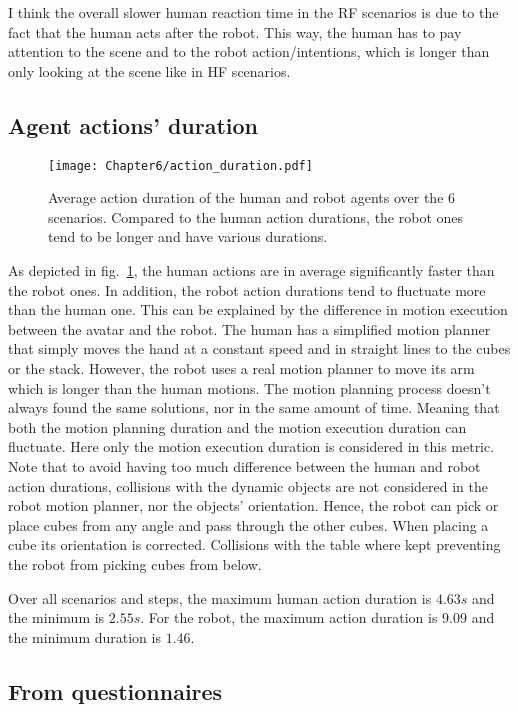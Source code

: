 I think the overall slower human reaction time in the RF scenarios is due to the fact that the human acts after the robot. This way, the human has to pay attention to the scene and to the robot action/intentions, which is longer than only looking at the scene like in HF scenarios.   


\subsection*{Agent actions' duration}

\begin{figure}[h]
    \center
    \texttt{[image: Chapter6/action\_duration.pdf]}
    \caption{Average action duration of the human and robot agents over the 6 scenarios. Compared to the human action durations, the robot ones tend to be longer and have various durations.}
    \label{fig:action_durations}
\end{figure}

As depicted in fig.~\ref{fig:action_durations}, the human actions are in average significantly faster than the robot ones. In addition, the robot action durations tend to fluctuate more than the human one. This can be explained by the difference in motion execution between the avatar and the robot. The human has a simplified motion planner that simply moves the hand at a constant speed and in straight lines to the cubes or the stack. However, the robot uses a real motion planner to move its arm which is longer than the human motions. The motion planning process doesn't always found the same solutions, nor in the same amount of time. Meaning that both the motion planning duration and the motion execution duration can fluctuate. Here only the motion execution duration is considered in this metric. Note that to avoid having too much difference between the human and robot action durations, collisions with the dynamic objects are not considered in the robot motion planner, nor the objects' orientation. Hence, the robot can pick or place cubes from any angle and pass through the other cubes. When placing a cube its orientation is corrected. Collisions with the table where kept preventing the robot from picking cubes from below.  

Over all scenarios and steps, the maximum human action duration is $4.63s$ and the minimum is  $2.55s$. For the robot, the maximum action duration is $9.09$ and the minimum duration is $1.46$.

\subsection{From questionnaires}

